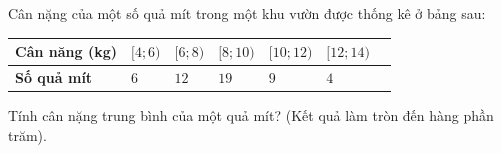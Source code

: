 \begin{ex}%
Cân nặng của một số quả mít trong một khu vườn được thống kê ở bảng sau:
\begin{center}
\begin{tabular}{|>{\centering\arraybackslash}m{4cm}|>{\centering\arraybackslash}m{2cm}|>{\centering\arraybackslash}m{2cm}|>{\centering\arraybackslash}m{2cm}|>{\centering\arraybackslash}m{2cm}|>{\centering\arraybackslash}m{2cm}|>{\centering\arraybackslash}m{2cm}|}
\hline
\textbf{Cân năng (kg)} & $[4;6)$ & $[6;8)$ & $[8;10)$ & $[10;12)$& $[12;14)$\\
\hline
\textbf{Số quả mít} & $6$ & $12$ & $19$ & $9$ & $4$\\
\hline
\end{tabular}
\end{center}
Tính cân nặng trung bình của một quả mít? (Kết quả làm tròn đến hàng phần trăm).
\end{ex}

